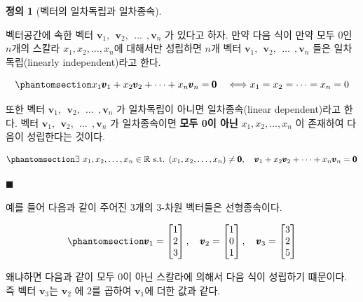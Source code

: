 \documentclass[
  11pt,
  a4paper,
  oneside]{scrbook}
\newcommand{\RR}{\mathbb{R}}
\theoremstyle{definition}
\newtheorem{definition}{정의}[chapter]
\theoremstyle{definition}
\theoremstyle{plain}
\theoremstyle{remark}
\begin{document}
\begin{definition}[벡터의 일차독립과
일차종속]\protect\hypertarget{def-linear-indep}{}\label{def-linear-indep}

벡터공간에 속한 벡터 \(\pmb v_1, ~~ \pmb v_2, ~~\dots ~~, \pmb v_n\) 가
있다고 하자. 만약 다음 식이 만약 모두 \(0\)인 \(n\)개의 스칼라
\(x_1,x_2,\dots,x_n\)에 대해서만 성립하면 \(n\)개 벡터
\(\pmb v_1, ~~ \pmb v_2, ~~\dots ~~, \pmb v_n\) 들은 일차독립(linearly
independent)라고 한다.

\begin{equation}\phantomsection\label{eq-linear-indep}{
x_1 \pmb v_1 + x_2 \pmb v_2 + \dots + x_n \pmb v_n = \pmb 0 \quad \Longleftrightarrow
x_1 = x_2 = \dots = x_n =0
}\end{equation}

또한 벡터 \(\pmb v_1, ~~ \pmb v_2, ~~\dots ~~, \pmb v_n\) 가 일차독립이
아니면 일차종속(linear dependent)라고 한다. 벡터
\(\pmb v_1, ~~ \pmb v_2, ~~\dots ~~, \pmb v_n\) 가 일차종속이면
\textbf{모두 0이 아닌} \(x_1,x_2,\dots,x_n\) 이 존재하여 다음이
성립한다는 것이다.

\begin{equation}\phantomsection\label{eq-linear-dep}{
\exists~ x_1,x_2,\dots,x_n \in \RR \text{ s.t. } (x_1,x_2,\dots,x_n) \ne \pmb 0,\quad  \pmb v_1 + x_2 \pmb v_2 + \dots + x_n \pmb v_n = \pmb 0 
}\end{equation}

\(\blacksquare\)

\end{definition}

예를 들어 다음과 같이 주어진 3개의 3-차원 벡터들은 선형종속이다.

\begin{equation}\phantomsection\label{eq-vactors-lin-dep}{
\pmb v_1 =
\begin{bmatrix}
1\\
2\\
3
\end{bmatrix},
\quad
\pmb v_2 =
\begin{bmatrix}
1\\
0\\
1
\end{bmatrix},
\quad
\pmb v_3 =
\begin{bmatrix}
3\\
2\\
5
\end{bmatrix}
}\end{equation}

왜냐하면 다음과 같이 모두 0이 아닌 스칼라에 의해서 다음 식이 성립하기
떄문이다. 즉 벡터 \(\pmb v_3\)는 \(\pmb v_2\) 에 2를 곱하여
\(\pmb v_1\)에 더한 값과 같다.
\end{document}
